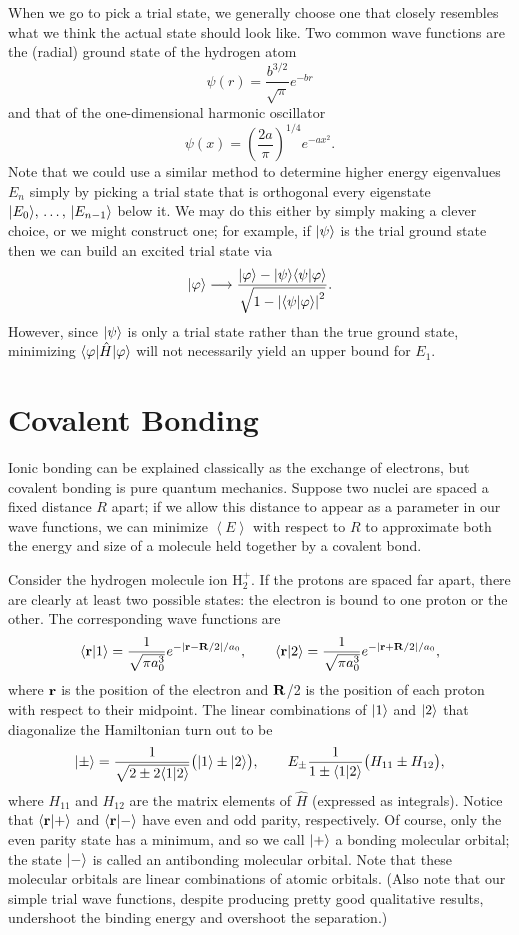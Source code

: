 \documentclass[../p116main.tex]{subfiles}
\begin{document}
When we go to pick a trial state, we generally choose one that closely resembles what we think the actual state should look like.
Two common wave functions are the (radial) ground state of the hydrogen atom
\[ \psi(r) = \frac{b^{3 / 2}}{\sqrt{\pi}} e^{-br} \]
and that of the one-dimensional harmonic oscillator
\[ \psi(x) = \left( \frac{2a}{\pi} \right)^{1 / 4} e^{-ax^2}. \]
Note that we could use a similar method to determine higher energy eigenvalues $E_n$ simply by picking a trial state that is orthogonal every eigenstate $|{E_0}\rangle, \, \ldots, \, |{E_{n-1}}\rangle$ below it.
We may do this either by simply making a clever choice, or we might construct one; for example, if $|{\psi}\rangle$ is the trial ground state then we can build an excited trial state via
\[ |{\varphi}\rangle \longrightarrow \frac{|{\varphi}\rangle - |{\psi}\rangle \langle{\psi}|{\varphi}\rangle}{\sqrt{1 - \left| \langle{\psi}|{\varphi}\rangle \right|^2}}. \]
However, since $|{\psi}\rangle$ is only a trial state rather than the true ground state, minimizing $\langle{\varphi}| \hat H |{\varphi}\rangle$ will not necessarily yield an upper bound for $E_1$.

\section{Covalent Bonding}
Ionic bonding can be explained classically as the exchange of electrons, but covalent bonding is pure quantum mechanics.
Suppose two nuclei are spaced a fixed distance $R$ apart; if we allow this distance to appear as a parameter in our wave functions, we can minimize $\left< E \right>$ with respect to $R$ to approximate both the energy and size of a molecule held together by a covalent bond.

Consider the hydrogen molecule ion $\text{H}_2^+$.
If the protons are spaced far apart, there are clearly at least two possible states: the electron is bound to one proton or the other.
The corresponding wave functions are
\[ \langle{\mathbf{r}}|{1}\rangle = \frac{1}{\sqrt{\pi a_0^3}} e^{-|\mathbf{r} - \mathbf{R} / 2| / a_0}, \qquad \langle{\mathbf{r}}|{2}\rangle = \frac{1}{\sqrt{\pi a_0^3}} e^{-|\mathbf{r} + \mathbf{R} / 2| / a_0}, \]
where $\mathbf{r}$ is the position of the electron and $\mathbf{R}$/2 is the position of each proton with respect to their midpoint.
The linear combinations of $|{1}\rangle$ and $|{2}\rangle$ that diagonalize the Hamiltonian turn out to be
\[ |{\pm}\rangle = \frac{1}{\sqrt{2 \pm 2 \langle{1}|{2}\rangle}} \big( |{1}\rangle \pm |{2}\rangle \big), \qquad E_\pm \frac{1}{1 \pm \langle{1}|{2}\rangle} \big( H_{11} \pm H_{12} \big), \]
where $H_{11}$ and $H_{12}$ are the matrix elements of $\hat H$ (expressed as integrals).
Notice that $\langle{\mathbf{r}}|{+}\rangle$ and $\langle{\mathbf{r}}|{-}\rangle$ have even and odd parity, respectively.
Of course, only the even parity state has a minimum, and so we call $|{+}\rangle$ a bonding molecular orbital; the state $|{-}\rangle$ is called an antibonding molecular orbital.
Note that these molecular orbitals are linear combinations of atomic orbitals.
(Also note that our simple trial wave functions, despite producing pretty good qualitative results, undershoot the binding energy and overshoot the separation.)
\end{document}
